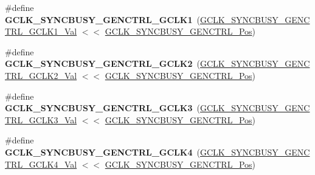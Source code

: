 \begin{DoxyCompactItemize}
\item 
\hypertarget{group___s_a_m_l21___g_c_l_k_ga907486accd2437d30703a7a42aa8869b}{}\#define {\bfseries G\+C\+L\+K\+\_\+\+S\+Y\+N\+C\+B\+U\+S\+Y\+\_\+\+G\+E\+N\+C\+T\+R\+L\+\_\+\+G\+C\+L\+K1}~(\hyperlink{group___s_a_m_l21___g_c_l_k_ga9207e5b7583059fa7b62937d320c87a4}{G\+C\+L\+K\+\_\+\+S\+Y\+N\+C\+B\+U\+S\+Y\+\_\+\+G\+E\+N\+C\+T\+R\+L\+\_\+\+G\+C\+L\+K1\+\_\+\+Val} $<$$<$ \hyperlink{group___s_a_m_l21___g_c_l_k_gaccbba8857cd7d67c4c0b526841298790}{G\+C\+L\+K\+\_\+\+S\+Y\+N\+C\+B\+U\+S\+Y\+\_\+\+G\+E\+N\+C\+T\+R\+L\+\_\+\+Pos})\label{group___s_a_m_l21___g_c_l_k_ga907486accd2437d30703a7a42aa8869b}

\item 
\hypertarget{group___s_a_m_l21___g_c_l_k_ga35caf7bdf0311fc5b3835db4411baf6d}{}\#define {\bfseries G\+C\+L\+K\+\_\+\+S\+Y\+N\+C\+B\+U\+S\+Y\+\_\+\+G\+E\+N\+C\+T\+R\+L\+\_\+\+G\+C\+L\+K2}~(\hyperlink{group___s_a_m_l21___g_c_l_k_ga54f2ec66d24d75af90f5f69e57eda372}{G\+C\+L\+K\+\_\+\+S\+Y\+N\+C\+B\+U\+S\+Y\+\_\+\+G\+E\+N\+C\+T\+R\+L\+\_\+\+G\+C\+L\+K2\+\_\+\+Val} $<$$<$ \hyperlink{group___s_a_m_l21___g_c_l_k_gaccbba8857cd7d67c4c0b526841298790}{G\+C\+L\+K\+\_\+\+S\+Y\+N\+C\+B\+U\+S\+Y\+\_\+\+G\+E\+N\+C\+T\+R\+L\+\_\+\+Pos})\label{group___s_a_m_l21___g_c_l_k_ga35caf7bdf0311fc5b3835db4411baf6d}

\item 
\hypertarget{group___s_a_m_l21___g_c_l_k_ga86475916fb11b62438df0d675a733ed6}{}\#define {\bfseries G\+C\+L\+K\+\_\+\+S\+Y\+N\+C\+B\+U\+S\+Y\+\_\+\+G\+E\+N\+C\+T\+R\+L\+\_\+\+G\+C\+L\+K3}~(\hyperlink{group___s_a_m_l21___g_c_l_k_gaa08b2a951ab29d44a151e2d11ecfc628}{G\+C\+L\+K\+\_\+\+S\+Y\+N\+C\+B\+U\+S\+Y\+\_\+\+G\+E\+N\+C\+T\+R\+L\+\_\+\+G\+C\+L\+K3\+\_\+\+Val} $<$$<$ \hyperlink{group___s_a_m_l21___g_c_l_k_gaccbba8857cd7d67c4c0b526841298790}{G\+C\+L\+K\+\_\+\+S\+Y\+N\+C\+B\+U\+S\+Y\+\_\+\+G\+E\+N\+C\+T\+R\+L\+\_\+\+Pos})\label{group___s_a_m_l21___g_c_l_k_ga86475916fb11b62438df0d675a733ed6}

\item 
\hypertarget{group___s_a_m_l21___g_c_l_k_gac0cc9f776498b0e5ca10317e82d0bd0d}{}\#define {\bfseries G\+C\+L\+K\+\_\+\+S\+Y\+N\+C\+B\+U\+S\+Y\+\_\+\+G\+E\+N\+C\+T\+R\+L\+\_\+\+G\+C\+L\+K4}~(\hyperlink{group___s_a_m_l21___g_c_l_k_ga3485377e599f7a35e8fcffe0904bde88}{G\+C\+L\+K\+\_\+\+S\+Y\+N\+C\+B\+U\+S\+Y\+\_\+\+G\+E\+N\+C\+T\+R\+L\+\_\+\+G\+C\+L\+K4\+\_\+\+Val} $<$$<$ \hyperlink{group___s_a_m_l21___g_c_l_k_gaccbba8857cd7d67c4c0b526841298790}{G\+C\+L\+K\+\_\+\+S\+Y\+N\+C\+B\+U\+S\+Y\+\_\+\+G\+E\+N\+C\+T\+R\+L\+\_\+\+Pos})\label{group___s_a_m_l21___g_c_l_k_gac0cc9f776498b0e5ca10317e82d0bd0d}


\end{DoxyCompactItemize}
